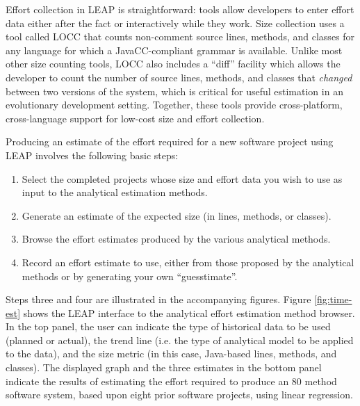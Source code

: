\begin{figure*}[t]
  {\centerline{}}
  \caption{The LEAP tool interface for effort estimation}
  \label{fig:time-est}
\end{figure*}

Effort collection in LEAP is straightforward: tools allow developers to
enter effort data either after the fact or interactively while they
work. Size collection uses a tool called LOCC \cite{csdl-99-10} that 
counts non-comment source lines, methods, and classes for any language for
which a JavaCC-compliant grammar is available.  Unlike most other size
counting tools, LOCC also includes a ``diff'' facility which allows the
developer to count the number of source lines, methods, and classes that {\em changed}
between two versions of the system, which is critical for useful
estimation in an evolutionary development setting.  Together, these tools
provide cross-platform, cross-language support for low-cost size and effort
collection. 

Producing an estimate of the effort required for a new software project
using LEAP involves the following basic steps:
\begin{enumerate}
\item Select the completed projects whose size and effort data you wish to use as input 
to the analytical estimation methods.
\item Generate an estimate of the expected size (in lines, methods, or
classes).
\item Browse the effort estimates produced by the various analytical methods.
\item Record an effort estimate to use, either from those proposed by the
analytical methods or by generating your own ``guesstimate''. 
\end{enumerate}

Steps three and four are illustrated in the accompanying figures.  Figure
\ref{fig:time-est} shows the LEAP interface to the analytical effort estimation
method browser.  In the top panel, the user can indicate the type of
historical data to be used (planned or actual), the trend line (i.e. the
type of analytical model to be applied to the data), and the size metric
(in this case, Java-based lines, methods, and classes).  The displayed
graph and the three estimates in the bottom panel indicate the results of
estimating the effort required to produce an 80 method software system, based
upon eight prior software projects, using linear regression.

